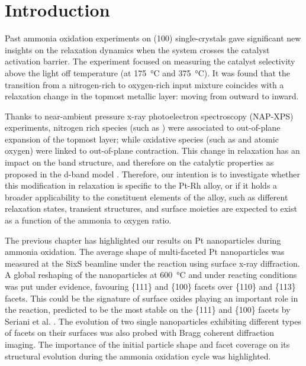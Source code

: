 \section{Introduction}

Past ammonia oxidation experiments on  (100) \parencite{Resta2020a} single-crystals gave significant new insights on the relaxation dynamics when the system crosses the catalyst activation barrier.
The experiment focused on measuring the catalyst selectivity above the light off temperature (at \qty{175}{\degreeCelsius} and \qty{375}{\degreeCelsius}).
It was found that the transition from a nitrogen-rich to oxygen-rich input mixture coincides with a relaxation change in the topmost metallic layer: moving from outward to inward.

Thanks to near-ambient pressure x-ray photoelectron spectroscopy (NAP-XPS) experiments, nitrogen rich species (such as ) were associated to out-of-plane expansion of the topmost layer; while oxidative species (such as  and atomic oxygen) were linked to out-of-plane contraction.
This change in relaxation has an impact on the band structure, and therefore on the catalytic properties as proposed in the d-band model \parencite{Mavrikakis1998}.
Therefore, our intention is to investigate whether this modification in relaxation is specific to the Pt-Rh alloy, or if it holds a broader applicability to the constituent elements of the alloy, such as different relaxation states, transient structures, and surface moieties are expected to exist as a function of the ammonia to oxygen ratio.

The previous chapter has highlighted our results on Pt nanoparticles during ammonia oxidation.
The average shape of multi-faceted Pt nanoparticles was measured at the SixS beamline under the reaction using surface x-ray diffraction.
A global reshaping of the nanoparticles at \qty{600}{\degreeCelsius} and under reacting conditions was put under evidence, favouring \{111\} and \{100\} facets over \{110\} and \{113\} facets.
This could be the signature of surface oxides playing an important role in the reaction, predicted to be the most stable on the \{111\} and \{100\} facets by Seriani et al. \parencite*{Seriani2008}.
The evolution of two single nanoparticles exhibiting different types of facets on their surfaces was also probed with Bragg coherent diffraction imaging.
The importance of the initial particle shape and facet coverage on its structural evolution during the ammonia oxidation cycle was highlighted.

